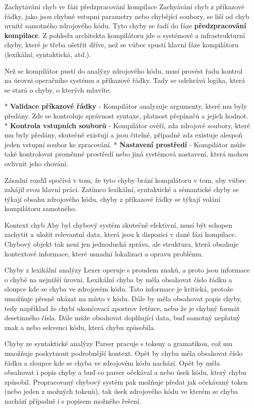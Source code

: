 \sec Zachytávání chyb ve fázi předzpracování kompilace
Zachyávání chyb z příkazové řádky, jako jsou chybné vstupní parametry nebo chybějící soubory, se liší od chyb uvnitř samotného zdrojového kódu. Tyto chyby se řadí do fáze {\bf předzpracování kompilace}. Z pohledu architekta kompilátoru jde o systémové a infrastrukturní chyby, které je třeba ošetřit dříve, než se vůbec spustí hlavní fáze kompilátoru (lexikální, syntaktická, atd.).

Než se kompilátor pustí do analýzy zdrojového kódu, musí provést řadu kontrol na úrovni operačního systému a příkazové řádky. Tady se odehrává logika, která se stará o chyby, o kterých mluvíte:

\begitems
* {\bf Validace příkazové řádky} - Kompilátor analyzuje argumenty, které mu byly předány. Zde se kontroluje správnost syntaxe, platnost přepínačů a jejich hodnot.
* {\bf Kontrola vstupních souborů} - Kompilátor ověří, zda zdrojové soubory, které mu byly předány, skutečně existují a jsou čitelné, případně zda existuje alespoň jeden vstupní soubor ke zpracování.
* {\bf Nastavení prostředí} - Kompilátor může také kontrolovat proměnné prostředí nebo jiná systémová nastavení, která mohou ovlivnit jeho chování.
\enditems

Zásadní rozdíl spočívá v tom, že tyto chyby brání kompilátoru v tom, aby vůbec zahájil svou hlavní práci. Zatímco lexikální, syntaktické a sémantické chyby se týkají obsahu zdrojového kódu, chyby z příkazové řádky se týkají volání kompilátoru samotného.

\sec Kontext chyb
Aby byl chybový systém skutečně efektivní, musí být schopen zachytit a uložit relevantní data, která jsou k dispozici v dané fázi kompilace. Chybový objekt tak není jen jednoduchá zpráva, ale struktura, která obsahuje kontextové informace, které usnadní lokalizaci a opravu problému.

\secc Chyby z lexikální analýzy
Lexer operuje s proudem znaků, a proto jsou informace o chybě na nejnižší úrovni. Lexikální chyba by měla obsahovat číslo řádku a sloupce kde se chyba ve zdrojovém kódu. Tato informace je kritická, protože umožňuje přesně ukázat na místo v kódu. Dále by měla obsahovat popis chyby, tedy například že chybí ukončovací apostrov řetězce, nebo že je chybný formát desetinného čísla. Dále může obsahovat doplňující data, buď samotný neplatný znak a nebo sekvenci kódu, která chybu způsobila.

\secc Chyby ze syntaktické analýzy
Parser pracuje s tokeny a gramatikou, což mu umožňuje poskytnout podrobnější kontext. Opět by chyba měla obsahovat číslo řádku a sloupce kde se chyba ve zdrojovém kódu nachází. Opět by měla obsahovat i popis chyby a buď co parser očekával a nebo úsek kódu, který chybu způsobil. Propracovaný chybový systém pak možňuje předat jak očekávaný token (nebo jeden z možných tokenů), tak úsek zdrojového kódu ve kterém se chyba nachází případně i s popisem možného řešení. 


